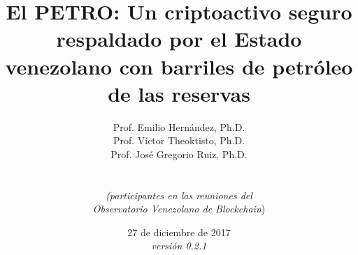 \documentclass[spanish,letterpaper,11pt]{article}
\title{\bf El  PETRO: Un criptoactivo seguro respaldado por el
Estado venezolano con barriles de petróleo de las reservas}
\author{%
	Prof. Emilio Hernández, Ph.D. \\%
	Prof. Víctor Theoktisto, Ph.D. \\%
	Prof. José Gregorio Ruiz, Ph.D. \\%
	\\~
    \\ \textit{(participantes en las reuniones del}
    \\ \textit{Observatorio Venezolano de Blockchain})%
}
\date{27 de diciembre de 2017 \\{%
\emph{versión 0.2.1}%
}%
}
\begin{document}
%
%
\maketitle
%
\begin{abstract}
%

%
\end{abstract}
%
%
\tableofcontents
%
%










\renewcommand{\appendixname}{Anexos}

\begin{appendices} %




%

\end{appendices}
\end{document}
